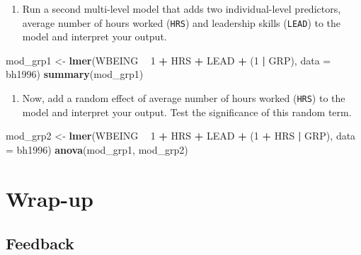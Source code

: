 \documentclass[]{book}
\newenvironment{Shaded}{\begin{snugshade}}{\end{snugshade}}
\newcommand{\KeywordTok}[1]{\textcolor[rgb]{0.13,0.29,0.53}{\textbf{#1}}}
\newcommand{\DataTypeTok}[1]{\textcolor[rgb]{0.13,0.29,0.53}{#1}}
\newcommand{\DecValTok}[1]{\textcolor[rgb]{0.00,0.00,0.81}{#1}}
\newcommand{\StringTok}[1]{\textcolor[rgb]{0.31,0.60,0.02}{#1}}
\newcommand{\OperatorTok}[1]{\textcolor[rgb]{0.81,0.36,0.00}{\textbf{#1}}}
\newcommand{\NormalTok}[1]{#1}
\providecommand{\tightlist}{%
  \setlength{\itemsep}{0pt}\setlength{\parskip}{0pt}}
\begin{document}
\begin{enumerate}
\def\labelenumi{\arabic{enumi}.}
\setcounter{enumi}{2}
\tightlist
\item
  Run a second multi-level model that adds two individual-level
  predictors, average number of hours worked (\texttt{HRS}) and
  leadership skills (\texttt{LEAD}) to the model and interpret your
  output.
\end{enumerate}

\begin{Shaded}
\begin{Highlighting}[]
\NormalTok{  mod_grp1 <-}\StringTok{ }\KeywordTok{lmer}\NormalTok{(WBEING }\OperatorTok{~}\StringTok{ }\DecValTok{1} \OperatorTok{+}\StringTok{ }\NormalTok{HRS }\OperatorTok{+}\StringTok{ }\NormalTok{LEAD }\OperatorTok{+}\StringTok{ }\NormalTok{(}\DecValTok{1} \OperatorTok{|}\StringTok{ }\NormalTok{GRP), }\DataTypeTok{data =}\NormalTok{ bh1996)}
  \KeywordTok{summary}\NormalTok{(mod_grp1)}
\end{Highlighting}
\end{Shaded}

\begin{enumerate}
\def\labelenumi{\arabic{enumi}.}
\setcounter{enumi}{2}
\tightlist
\item
  Now, add a random effect of average number of hours worked
  (\texttt{HRS}) to the model and interpret your output. Test the
  significance of this random term.
\end{enumerate}

\begin{Shaded}
\begin{Highlighting}[]
\NormalTok{  mod_grp2 <-}\StringTok{ }\KeywordTok{lmer}\NormalTok{(WBEING }\OperatorTok{~}\StringTok{ }\DecValTok{1} \OperatorTok{+}\StringTok{ }\NormalTok{HRS }\OperatorTok{+}\StringTok{ }\NormalTok{LEAD }\OperatorTok{+}\StringTok{ }\NormalTok{(}\DecValTok{1} \OperatorTok{+}\StringTok{ }\NormalTok{HRS }\OperatorTok{|}\StringTok{ }\NormalTok{GRP), }\DataTypeTok{data =}\NormalTok{ bh1996)}
  \KeywordTok{anova}\NormalTok{(mod_grp1, mod_grp2)}
\end{Highlighting}
\end{Shaded}

\section{Wrap-up}\label{wrap-up-2}

\subsection{Feedback}\label{feedback-2}
\end{document}
